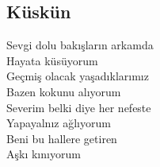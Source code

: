 \subsection{Küskün}

Sevgi dolu bakışların arkamda \\
Hayata küsüyorum \\
Geçmiş olacak yaşadıklarımız \\
Bazen kokunu alıyorum \\
Severim belki diye her nefeste \\
Yapayalnız ağlıyorum \\
Beni bu hallere getiren \\
Aşkı kınıyorum \\